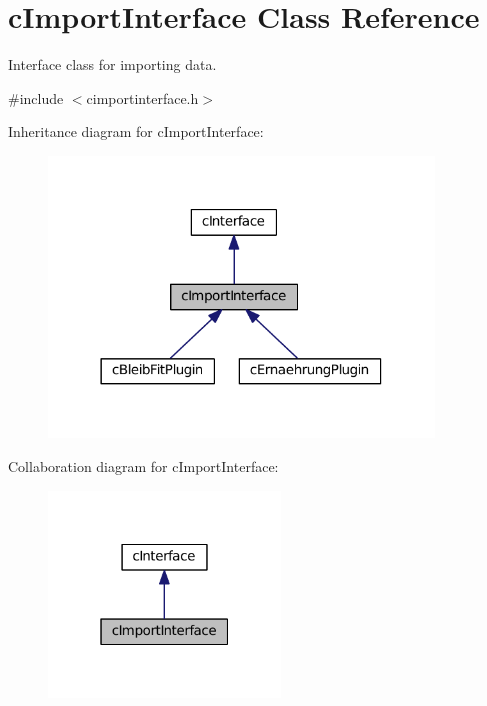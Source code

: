 \hypertarget{classc_import_interface}{}\section{c\+Import\+Interface Class Reference}
\label{classc_import_interface}


Interface class for importing data.  




{\ttfamily \#include $<$cimportinterface.\+h$>$}



Inheritance diagram for c\+Import\+Interface\+:
\nopagebreak
\begin{figure}[H]
\begin{center}
\leavevmode
\includegraphics[width=290pt]{classc_import_interface__inherit__graph}
\end{center}
\end{figure}


Collaboration diagram for c\+Import\+Interface\+:
\nopagebreak
\begin{figure}[H]
\begin{center}
\leavevmode
\includegraphics[width=175pt]{classc_import_interface__coll__graph}
\end{center}
\end{figure}
